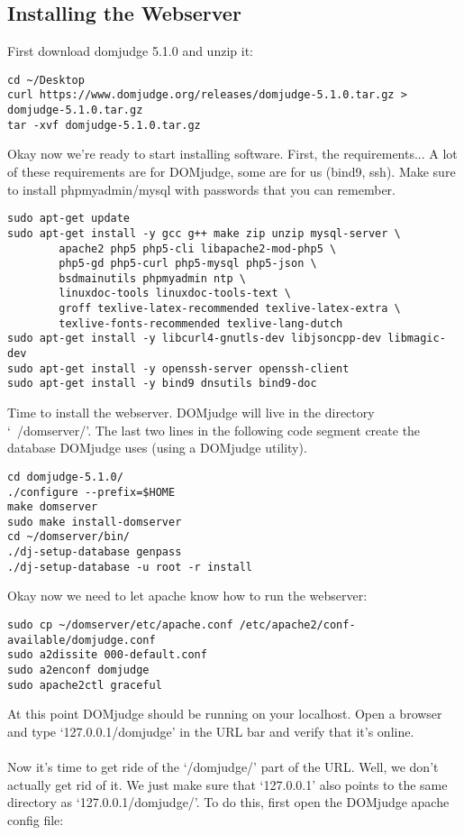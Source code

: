 \documentclass[a4paper,11pt]{article}
\begin{document}
\subsection{Installing the Webserver}
First download domjudge 5.1.0 and unzip it:
\begin{verbatim}
cd ~/Desktop
curl https://www.domjudge.org/releases/domjudge-5.1.0.tar.gz > domjudge-5.1.0.tar.gz
tar -xvf domjudge-5.1.0.tar.gz
\end{verbatim}
Okay now we're ready to start installing software. First, the requirements... A lot of these requirements are for DOMjudge, some are for us (bind9, ssh). Make sure to install phpmyadmin/mysql with passwords that you can remember.
\begin{verbatim}
sudo apt-get update
sudo apt-get install -y gcc g++ make zip unzip mysql-server \
        apache2 php5 php5-cli libapache2-mod-php5 \
        php5-gd php5-curl php5-mysql php5-json \
        bsdmainutils phpmyadmin ntp \
        linuxdoc-tools linuxdoc-tools-text \
        groff texlive-latex-recommended texlive-latex-extra \
        texlive-fonts-recommended texlive-lang-dutch
sudo apt-get install -y libcurl4-gnutls-dev libjsoncpp-dev libmagic-dev
sudo apt-get install -y openssh-server openssh-client
sudo apt-get install -y bind9 dnsutils bind9-doc
\end{verbatim}
Time to install the webserver. DOMjudge will live in the directory `~/domserver/'. The last two lines in the following code segment create the database DOMjudge uses (using a DOMjudge utility).
\begin{verbatim}
cd domjudge-5.1.0/
./configure --prefix=$HOME
make domserver
sudo make install-domserver
cd ~/domserver/bin/
./dj-setup-database genpass
./dj-setup-database -u root -r install
\end{verbatim}
Okay now we need to let apache know how to run the webserver:
\begin{verbatim}
sudo cp ~/domserver/etc/apache.conf /etc/apache2/conf-available/domjudge.conf
sudo a2dissite 000-default.conf
sudo a2enconf domjudge 
sudo apache2ctl graceful
\end{verbatim}
At this point DOMjudge should be running on your localhost. Open a browser and type `127.0.0.1/domjudge' in the URL bar and verify that it's online.
\\\\
Now it's time to get ride of the `/domjudge/' part of the URL. Well, we don't actually get rid of it. We just make sure that `127.0.0.1' also points to the same directory as `127.0.0.1/domjudge/'. To do this, first open the DOMjudge apache config file:
\end{document}

